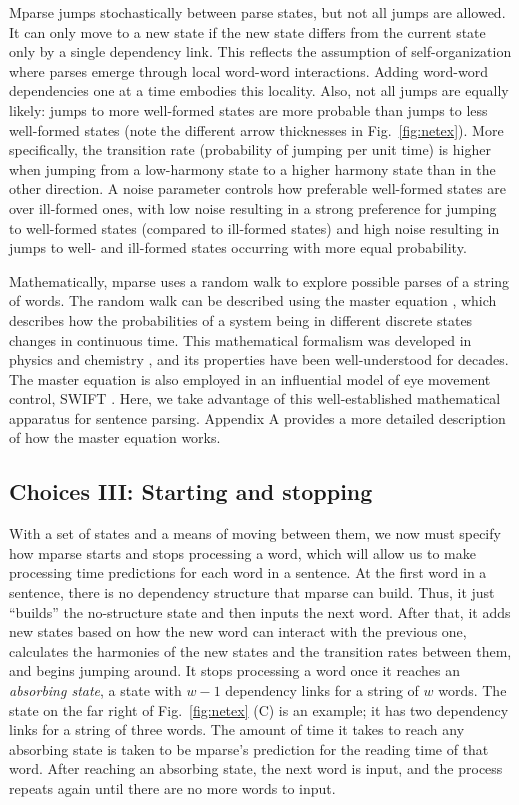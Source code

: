 \documentclass[a4paper, 12pt]{article}
\begin{document}
Mparse jumps stochastically between parse states, but not all jumps are
allowed. It can only move to a new state if the new state differs from the
current state only by a single dependency link. This reflects the assumption of
self-organization where parses emerge through local word-word interactions.
Adding word-word dependencies one at a time embodies this locality. Also, not
all jumps are equally likely: jumps to more well-formed states are more
probable than jumps to less well-formed states (note the different arrow
thicknesses in Fig.~\ref{fig:netex}). More specifically, the transition rate
(probability of jumping per unit time) is higher when jumping from a
low-harmony state to a higher harmony state than in the other direction. A
noise parameter controls how preferable well-formed states are over ill-formed
ones, with low noise resulting in a strong preference for jumping to
well-formed states (compared to ill-formed states) and high noise resulting in
jumps to well- and ill-formed states occurring with more equal probability.

Mathematically, mparse uses a random walk to explore possible parses of a
string of words. The random walk can be described using the master equation
\citep{vankampen2007stochastic}, which describes how the probabilities of a
system being in different discrete states changes in continuous time. This
mathematical formalism was developed in physics and chemistry \citep[see the
papers reprinted in][for examples]{oppenheim1977stochastic}, and its properties
have been well-understood for decades. The master equation is also employed in
an influential model of eye movement control, SWIFT \citep{engbert2005swift,
    engbert2002dynamical}. Here, we take advantage of this
well-established mathematical apparatus for sentence parsing. Appendix A
provides a more detailed description of how the master equation works.
 
\subsection{Choices III: Starting and stopping}
With a set of states and a means of moving between them, we now must specify
how mparse starts and stops processing a word, which will allow us to make
processing time predictions for each word in a sentence. At the first word in a
sentence, there is no dependency structure that mparse can build. Thus, it
just ``builds'' the no-structure state and then inputs the next word. After
that, it adds new states based on how the new word can interact with the
previous one, calculates the harmonies of the new states and the transition
rates between them, and begins jumping around. It stops
processing a word once it reaches an \emph{absorbing state}, a state with $w -
1$ dependency links for a string of $w$ words. The state on the far right of
Fig.~\ref{fig:netex} (C) is an example; it has two dependency links for a
string of three words. The amount of time it takes to
reach any absorbing state is taken to be mparse's prediction for the reading
time of that word.  After reaching an absorbing state, the next word is input,
and the process repeats again until there are no more words to input.
\end{document}
